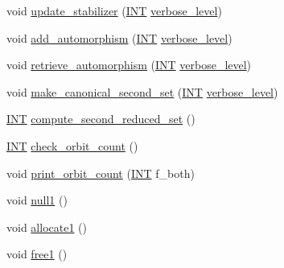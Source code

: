 \begin{DoxyCompactItemize}
\item 
void \mbox{\hyperlink{classcompute__stabilizer_a9d7978a6326dc7f0935f557f0828ed8e}{update\+\_\+stabilizer}} (\mbox{\hyperlink{galois_8h_a09fddde158a3a20bd2dcadb609de11dc}{I\+NT}} \mbox{\hyperlink{simeon_8_c_a818073fbcc2f439e7c56952f67386122}{verbose\+\_\+level}})
\item 
void \mbox{\hyperlink{classcompute__stabilizer_a502a7a928fa84be6c9ae36d5dac36b54}{add\+\_\+automorphism}} (\mbox{\hyperlink{galois_8h_a09fddde158a3a20bd2dcadb609de11dc}{I\+NT}} \mbox{\hyperlink{simeon_8_c_a818073fbcc2f439e7c56952f67386122}{verbose\+\_\+level}})
\item 
void \mbox{\hyperlink{classcompute__stabilizer_a363640c4b0009ef9ab5999a436647ac0}{retrieve\+\_\+automorphism}} (\mbox{\hyperlink{galois_8h_a09fddde158a3a20bd2dcadb609de11dc}{I\+NT}} \mbox{\hyperlink{simeon_8_c_a818073fbcc2f439e7c56952f67386122}{verbose\+\_\+level}})
\item 
void \mbox{\hyperlink{classcompute__stabilizer_aa33f9b1e4823afd5196eec36d3082084}{make\+\_\+canonical\+\_\+second\+\_\+set}} (\mbox{\hyperlink{galois_8h_a09fddde158a3a20bd2dcadb609de11dc}{I\+NT}} \mbox{\hyperlink{simeon_8_c_a818073fbcc2f439e7c56952f67386122}{verbose\+\_\+level}})
\item 
\mbox{\hyperlink{galois_8h_a09fddde158a3a20bd2dcadb609de11dc}{I\+NT}} \mbox{\hyperlink{classcompute__stabilizer_a57c4a58f5f2ba1ed72251e7930b85560}{compute\+\_\+second\+\_\+reduced\+\_\+set}} ()
\item 
\mbox{\hyperlink{galois_8h_a09fddde158a3a20bd2dcadb609de11dc}{I\+NT}} \mbox{\hyperlink{classcompute__stabilizer_acf26d57835dab2f1509434a63b710d4a}{check\+\_\+orbit\+\_\+count}} ()
\item 
void \mbox{\hyperlink{classcompute__stabilizer_a92067e7d85262d77b1c6398e611ad78a}{print\+\_\+orbit\+\_\+count}} (\mbox{\hyperlink{galois_8h_a09fddde158a3a20bd2dcadb609de11dc}{I\+NT}} f\+\_\+both)
\item 
void \mbox{\hyperlink{classcompute__stabilizer_aab107ccd433a41ca482a561feae048fc}{null1}} ()
\item 
void \mbox{\hyperlink{classcompute__stabilizer_a50f0f1f0213537c29e05d00e98268c1c}{allocate1}} ()
\item 
void \mbox{\hyperlink{classcompute__stabilizer_ac397d76532b2ac7a30ea8946e3be769c}{free1}} ()
\end{DoxyCompactItemize}
